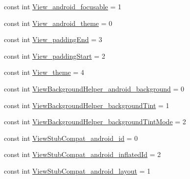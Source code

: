 \begin{CompactItemize}
\item 
const int \hyperlink{class__2doo_1_1_droid_1_1_resource_1_1_styleable_40908f341b49b3e6357f0740e596a346}{View\_\-android\_\-focusable} = 1
\item 
const int \hyperlink{class__2doo_1_1_droid_1_1_resource_1_1_styleable_582f6e13b5f6e9b24198bc2162a15354}{View\_\-android\_\-theme} = 0
\item 
const int \hyperlink{class__2doo_1_1_droid_1_1_resource_1_1_styleable_4c21e56772b8da0e6bde3b85be68e95f}{View\_\-paddingEnd} = 3
\item 
const int \hyperlink{class__2doo_1_1_droid_1_1_resource_1_1_styleable_5741384d302235f14e7505c8e9de1f37}{View\_\-paddingStart} = 2
\item 
const int \hyperlink{class__2doo_1_1_droid_1_1_resource_1_1_styleable_40ba0cb0f193516b92248a1cefb65909}{View\_\-theme} = 4
\item 
const int \hyperlink{class__2doo_1_1_droid_1_1_resource_1_1_styleable_984f42e4319940042997d31f36604a42}{ViewBackgroundHelper\_\-android\_\-background} = 0
\item 
const int \hyperlink{class__2doo_1_1_droid_1_1_resource_1_1_styleable_818bf959701ac12bf09140415dccf8bb}{ViewBackgroundHelper\_\-backgroundTint} = 1
\item 
const int \hyperlink{class__2doo_1_1_droid_1_1_resource_1_1_styleable_f9c4e71e27e3a709d28eebf70841a6b5}{ViewBackgroundHelper\_\-backgroundTintMode} = 2
\item 
const int \hyperlink{class__2doo_1_1_droid_1_1_resource_1_1_styleable_65aff0a08cd100f823e9e9bd06397e64}{ViewStubCompat\_\-android\_\-id} = 0
\item 
const int \hyperlink{class__2doo_1_1_droid_1_1_resource_1_1_styleable_99e325b263c236e077fc8a03479b7682}{ViewStubCompat\_\-android\_\-inflatedId} = 2
\item 
const int \hyperlink{class__2doo_1_1_droid_1_1_resource_1_1_styleable_f1a11f917efa817fb73164a261a9f56e}{ViewStubCompat\_\-android\_\-layout} = 1
\end{CompactItemize}
